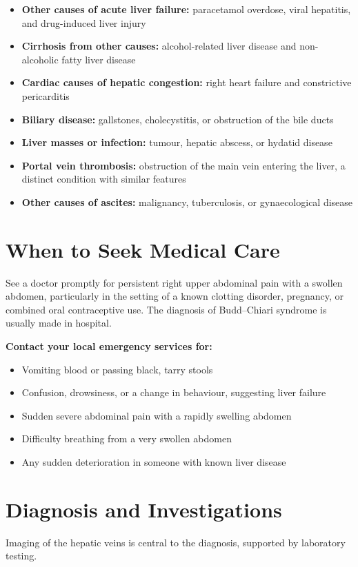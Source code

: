 \begin{itemize}
    \item \textbf{Other causes of acute liver failure:} paracetamol overdose, viral hepatitis, and drug-induced liver injury
    \item \textbf{Cirrhosis from other causes:} alcohol-related liver disease and non-alcoholic fatty liver disease
    \item \textbf{Cardiac causes of hepatic congestion:} right heart failure and constrictive pericarditis
    \item \textbf{Biliary disease:} gallstones, cholecystitis, or obstruction of the bile ducts
    \item \textbf{Liver masses or infection:} tumour, hepatic abscess, or hydatid disease
    \item \textbf{Portal vein thrombosis:} obstruction of the main vein entering the liver, a distinct condition with similar features
    \item \textbf{Other causes of ascites:} malignancy, tuberculosis, or gynaecological disease
\end{itemize}

\section*{When to Seek Medical Care}
See a doctor promptly for persistent right upper abdominal pain with a swollen abdomen, particularly in the setting of a known clotting disorder, pregnancy, or combined oral contraceptive use. The diagnosis of Budd--Chiari syndrome is usually made in hospital.

\textbf{Contact your local emergency services for:}
\begin{itemize}
    \item Vomiting blood or passing black, tarry stools
    \item Confusion, drowsiness, or a change in behaviour, suggesting liver failure
    \item Sudden severe abdominal pain with a rapidly swelling abdomen
    \item Difficulty breathing from a very swollen abdomen
    \item Any sudden deterioration in someone with known liver disease
\end{itemize}

\section*{Diagnosis and Investigations}
Imaging of the hepatic veins is central to the diagnosis, supported by laboratory testing.

